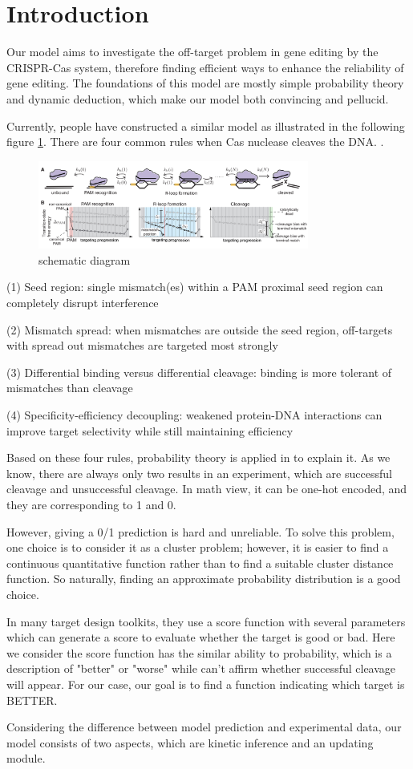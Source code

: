 \section{Introduction}
Our model aims to investigate the off-target problem in gene editing by the CRISPR-Cas system, therefore finding efficient ways to enhance the reliability of gene editing. The foundations of this model are mostly simple probability theory and dynamic deduction, which make our model both convincing and pellucid.
	
Currently, people have constructed a similar model as illustrated in the following figure \ref{fig:1}. There are four common rules when Cas nuclease cleaves the DNA\cite{klein2018hybridization}.
	.
\begin{figure}[tbph]
\centering
\includegraphics[width=3.5in]{1}
\caption{schematic diagram}
\label{fig:1}
\end{figure}
	
(1) Seed region: single mismatch(es) within a PAM proximal seed region can completely disrupt interference\par
(2) Mismatch spread: when mismatches are outside the seed region, off-targets with spread out mismatches are targeted most strongly\par
(3) Differential binding versus differential cleavage: binding is more tolerant of mismatches than cleavage\par 
(4) Specificity-efficiency decoupling: weakened protein-DNA interactions can improve target selectivity while still maintaining efficiency\par

Based on these four rules, probability theory is applied in to explain it. As we know, there are always only two results in an experiment, which are successful cleavage and unsuccessful cleavage. In math view, it can be one-hot encoded, and they are corresponding to 1 and 0. 

However, giving a 0/1 prediction is hard and unreliable. To solve this problem, one choice is to consider it as a cluster problem; however, it is easier to find a continuous quantitative function rather than to find a suitable cluster distance function. So naturally, finding an approximate probability distribution is a good choice. 
	
In many target design toolkits, they use a score function with several parameters which can generate a score to evaluate whether the target is good or bad. Here we consider the score function has the similar ability to probability, which is a description of "better" or "worse" while can’t affirm whether successful cleavage will appear. For our case, our goal is to find a function indicating which target is BETTER.
	
Considering the difference between model prediction and experimental data, our model consists of two aspects, which are kinetic inference and an updating module.